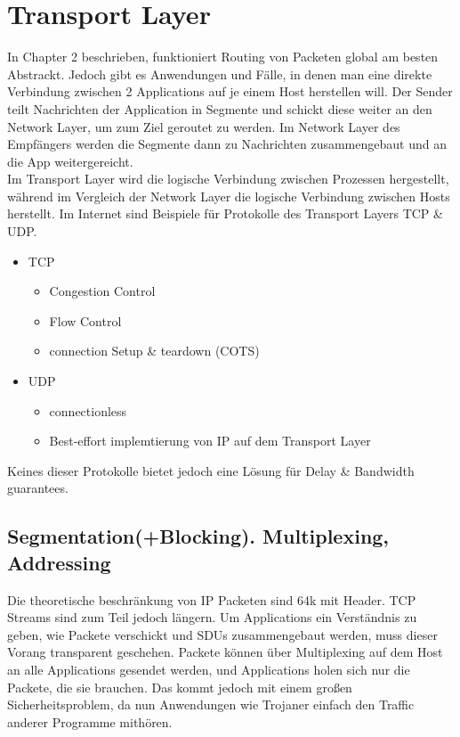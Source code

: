 \section{Transport Layer}
	In Chapter 2 beschrieben, funktioniert Routing von Packeten global am besten Abstrackt. Jedoch gibt es Anwendungen und Fälle, in denen man eine direkte Verbindung zwischen 2 Applications auf je einem Host herstellen will. Der Sender teilt Nachrichten der Application in Segmente und schickt diese weiter an den Network Layer, um zum Ziel geroutet zu werden. Im Network Layer des Empfängers werden die Segmente dann zu Nachrichten zusammengebaut und an die App weitergereicht. \\
	Im Transport Layer wird die logische Verbindung zwischen Prozessen hergestellt, während im Vergleich der Network Layer die logische Verbindung zwischen Hosts herstellt. Im Internet sind Beispiele für Protokolle des Transport Layers TCP \& UDP. 
	\begin{itemize}
		\item TCP
			\begin{itemize}
				\item Congestion Control
				\item Flow Control
				\item connection Setup \& teardown  (COTS)
			\end{itemize}
		\item UDP  
			\begin{itemize}
				\item connectionless
				\item Best-effort implemtierung von IP auf dem Transport Layer
			\end{itemize}
	\end{itemize}
	Keines dieser Protokolle bietet jedoch eine Lösung für Delay \& Bandwidth guarantees.

	\subsection{Segmentation(+Blocking). Multiplexing, Addressing}
		Die theoretische beschränkung von IP Packeten sind 64k mit Header. TCP Streams sind zum Teil jedoch längern. Um Applications ein Verständnis zu geben, wie Packete verschickt und SDUs zusammengebaut werden, muss dieser Vorang transparent geschehen. Packete können über Multiplexing auf dem Host an alle Applications gesendet werden, und Applications holen sich nur die Packete, die sie brauchen. Das kommt jedoch mit einem großen Sicherheitsproblem, da nun Anwendungen wie Trojaner einfach den Traffic anderer Programme mithören. 

